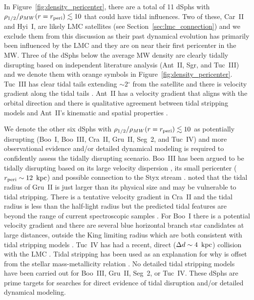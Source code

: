 \documentclass[twocolumn]{aastex63}
\newcommand{\degree}{\ensuremath{{}^{\circ}}\xspace}
\begin{document}
In Figure~\ref{fig:density_pericenter}, there are a total of 11 dSphs with $\rho_{1/2}/\rho_{MW}(r=r_{\rm peri}) \lesssim 10$ that could have tidal influences. Two of these, Car~II and Hyi~I,  are likely LMC satellites (see Section~\ref{sec:lmc_connection})  and we exclude them from this discussion as their past dynamical evolution has primarily been influenced  by the LMC and they are on near their  first pericenter in the MW.
Three of the dSphs below the average MW density are clearly tidally disrupting based on independent literature analysis  (Ant~II, Sgr, and Tuc~III) and we  denote them with orange symbols in  Figure~\ref{fig:density_pericenter}.
Tuc~III has clear tidal tails extending $\sim2\degree$ from the satellite  \citep{DrlicaWagner2015ApJ...813..109D, Shipp2018ApJ...862..114S} and there is  velocity gradient along the tidal tails \citep{Li2018ApJ...866...22L}. 
Ant~II has a velocity gradient that aligns with the orbital direction  and there is qualitative agreement between tidal stripping models and Ant~II's kinematic and spatial properties  \citep{Ji2021ApJ...921...32J, Vivas2022ApJ...926...78V}. 


We denote the other six dSphs with $\rho_{1/2}/\rho_{MW}(r=r_{\rm peri}) \lesssim 10$ as potentially disrupting (Boo~I, Boo~III, Cra~II, Gru~II, Seg~2, and Tuc~IV) and   more observational evidence and/or detailed dynamical modeling is required to confidently assess the tidally disrupting scenario. 
Boo~III has been argued to be tidally disrupting based on its large velocity dispersion \citep{Carlin2009ApJ...702L...9C}, its small pericenter ($r_{\rm peri} \sim 12 ~\mathrm{\,kpc}$)  and possible connection to the Styx stream \citep{Carlin2018ApJ...865....7C}.
\citet{Simon2020ApJ...892..137S} noted that the tidal radius of Gru~II is just larger than its physical size and may be vulnerable to tidal stripping. 
There is a tentative velocity gradient in Cra~II and  the tidal radius is less than the half-light radius but the predicted tidal features are beyond the range of current spectroscopic samples   \citep{Ji2021ApJ...921...32J}.
For Boo~I there is a potential velocity gradient \citep{Longeard2021arXiv210710849L} and there are several blue horizontal branch star candidates at large distances, outside the King limiting radius \citep{Filion2021ApJ...923..218F} which are both  consistent with tidal stripping models \citep{Longeard2021arXiv210710849L, Filion2021ApJ...923..218F}.
Tuc~IV  has had a recent, direct ($\Delta d \sim 4 ~\mathrm{\,kpc}$) collision with the LMC \citep{Simon2020ApJ...892..137S}. Tidal stripping has been used as an explanation for why  is offset from the stellar mass-metallicity relation  \citep{Kirby2013ApJ...770...16K}. 
No detailed tidal stripping models have been carried out for Boo~III,  Gru~II,  Seg~2, or Tuc~IV.
These dSphs are prime targets for searches for direct evidence of tidal disruption and/or detailed dynamical modeling.
\end{document}
